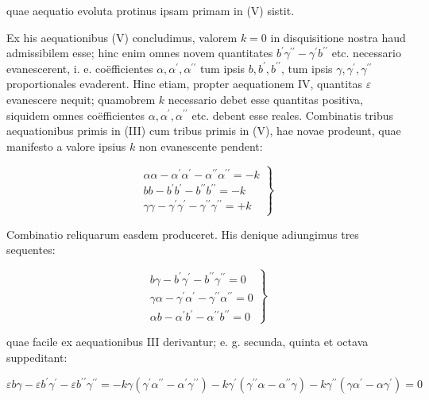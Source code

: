 \documentclass[10pt]{article}
\begin{document}
quae aequatio evoluta protinus ipsam primam in (V) sistit.

Ex his aequationibus (V) concludimus, valorem \(k=0\) in disquisitione nostra haud admissibilem esse; hinc enim omnes novem quantitates \(b^{\prime} \gamma^{\prime \prime}-\gamma^{\prime} b^{\prime \prime}\) etc. necessario evanescerent, i. e. coëfficientes \(\alpha, \alpha^{\prime}, \alpha^{\prime \prime}\) tum ipsis \(b, b^{\prime}, b^{\prime \prime}\), tum ipsis \(\gamma, \gamma^{\prime}, \gamma^{\prime \prime}\) proportionales evaderent. Hinc etiam, propter aequationem IV, quantitas \(\varepsilon\) evanescere nequit; quamobrem \(k\) necessario debet esse quantitas positiva, siquidem omnes coëfficientes \(\alpha, \alpha^{\prime}, \alpha^{\prime \prime}\) etc. debent esse reales. Combinatis tribus aequationibus primis in (III) cum tribus primis in (V), hae novae prodeunt, quae manifesto a valore ipsius \(k\) non evanescente pendent:

\[
\left.\begin{array}{l}
\alpha \alpha-\alpha^{\prime} \alpha^{\prime}-\alpha^{\prime \prime} \alpha^{\prime \prime}=-k \\
b b-b^{\prime} b^{\prime}-b^{\prime \prime} b^{\prime \prime}=-k \\
\gamma \gamma-\gamma^{\prime} \gamma^{\prime}-\gamma^{\prime \prime} \gamma^{\prime \prime}=+k
\end{array}\right\}
\]

Combinatio reliquarum easdem produceret. His denique adiungimus tres sequentes:

\[
\left.\begin{array}{l}
b \gamma-b^{\prime} \gamma^{\prime}-b^{\prime \prime} \gamma^{\prime \prime}=0 \\
\gamma \alpha-\gamma^{\prime} \alpha^{\prime}-\gamma^{\prime \prime} \alpha^{\prime \prime}=0 \\
\alpha b-\alpha^{\prime} b^{\prime}-\alpha^{\prime \prime} b^{\prime \prime}=0
\end{array}\right\}
\]

quae facile ex aequationibus III derivantur; e. g. secunda, quinta et octava suppeditant:

\[
\varepsilon b \gamma-\varepsilon b^{\prime} \gamma^{\prime}-\varepsilon b^{\prime \prime} \gamma^{\prime \prime}=-k \gamma\left(\gamma^{\prime} \alpha^{\prime \prime}-\alpha^{\prime} \gamma^{\prime \prime}\right)-k \gamma^{\prime}\left(\gamma^{\prime \prime} \alpha-\alpha^{\prime \prime} \gamma\right)-k \gamma^{\prime \prime}\left(\gamma \alpha^{\prime}-\alpha \gamma^{\prime}\right)=0
\]
\end{document}
